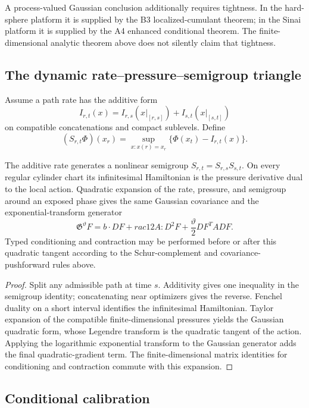 A process-valued Gaussian conclusion additionally requires tightness.  In the
hard-sphere platform it is supplied by the B3 localized-cumulant theorem; in
the Sinai platform it is supplied by the A4 enhanced conditional theorem.
The finite-dimensional analytic theorem above does not silently claim that
tightness.

\subsection{The dynamic rate--pressure--semigroup triangle}

Assume a path rate has the additive form
\[
I_{r,t}(x)=I_{r,s}(x|_{[r,s]})+I_{s,t}(x|_{[s,t]})
\]
on compatible concatenations and compact sublevels.  Define
\[
(S_{r,t}\Phi)(x_r)=
\sup_{x:x(r)=x_r}\{\Phi(x_t)-I_{r,t}(x)\}.
\]

\begin{theorem}
\label{thm:r6-d1-dynamic}
The additive rate generates a nonlinear semigroup
\(S_{r,t}=S_{r,s}S_{s,t}\).  On every regular cylinder chart its infinitesimal
Hamiltonian is the pressure derivative dual to the local action.  Quadratic
expansion of the rate, pressure, and semigroup around an exposed phase gives
the same Gaussian covariance and the exponential-transform generator
\[
\mathfrak G^\vartheta F=
 b\cdot DF+rac12A:D^2F+
\frac\vartheta2DF^TADF.
\]
Typed conditioning and contraction may be performed before or after this
quadratic tangent according to the Schur-complement and covariance-pushforward
rules above.
\end{theorem}

\begin{proof}
Split any admissible path at time \(s\).  Additivity gives one inequality in
the semigroup identity; concatenating near optimizers gives the reverse.
Fenchel duality on a short interval identifies the infinitesimal Hamiltonian.
Taylor expansion of the compatible finite-dimensional pressures yields the
Gaussian quadratic form, whose Legendre transform is the quadratic tangent of
the action.  Applying the logarithmic exponential transform to the Gaussian
generator adds the final quadratic-gradient term.  The finite-dimensional
matrix identities for conditioning and contraction commute with this
expansion.
\end{proof}

\subsection{Conditional calibration}


